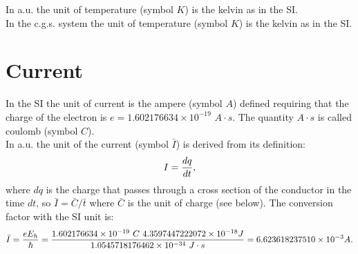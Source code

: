 \documentclass[12pt,a4paper]{article}
\def\hbarf{1.0545718176462\times 10^{-34}}
\def\e{1.602176634\times 10^{-19}}
\def\baru{4.3597447222072\times 10^{-18}}
\def\bari{6.623618237510\times 10^{-3}}
\def\barc{1.602176634\times 10^{-19}}
\begin{document}
{\color{web-blue} In a.u. the unit of temperature (symbol $K$) is the 
kelvin as in the SI.}
\\

{\color{orange} In the c.g.s. system the unit of temperature (symbol $K$) 
is the kelvin as in the SI.}

\newpage
\section{\color{coral}Current}
In the SI the unit of current is the ampere (symbol $A$) defined
requiring that the charge of the electron is $e=\e$ $A\cdot s$.
The quantity $A\cdot s$ is called coulomb (symbol $C$).
\\

{\color{web-blue} In a.u. the unit of the current (symbol $\bar I$) is  
derived from its definition:
\begin{equation}
I={dq \over dt}, 
\end{equation}
where $dq$ is the charge that passes through a cross section of the conductor
in the time $dt$, so $\bar I = \bar C / \bar t$ where $\bar C$ is the 
unit of charge (see below). The conversion factor with the SI unit is:
\begin{equation}
\bar I = {e E_h \over \hbar}={\barc\ C\ \baru J \over 
\hbarf\  J\cdot s} = \bari A.
\end{equation}
}
\\
\end{document}
